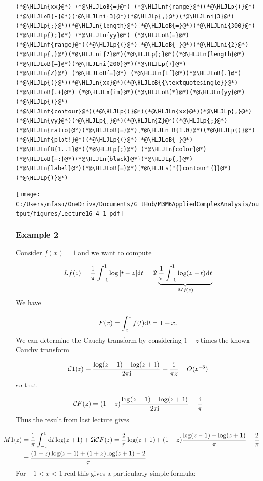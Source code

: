 \documentclass[12pt,landscape]{article}
\newcommand{\HLJLn}[1]{#1}
\newcommand{\HLJLnf}[1]{\textcolor[RGB]{66,102,213}{#1}}
\newcommand{\HLJLs}[1]{\textcolor[RGB]{201,61,57}{#1}}
\newcommand{\HLJLnfB}[1]{\textcolor[RGB]{59,151,46}{#1}}
\newcommand{\HLJLni}[1]{\textcolor[RGB]{59,151,46}{#1}}
\newcommand{\HLJLoB}[1]{\textcolor[RGB]{102,102,102}{\textbf{#1}}}
\newcommand{\HLJLp}[1]{#1}
\def\D{ {\rm d} }
\def\I{ {\rm i} }
\def\CC{ {\cal C} }
\begin{document}
{\begin{lstlisting}
(*@\HLJLn{xx}@*) (*@\HLJLoB{=}@*) (*@\HLJLnf{range}@*)(*@\HLJLp{(}@*)(*@\HLJLoB{-}@*)(*@\HLJLni{3}@*)(*@\HLJLp{,}@*)(*@\HLJLni{3}@*)(*@\HLJLp{;}@*)(*@\HLJLn{length}@*)(*@\HLJLoB{=}@*)(*@\HLJLni{300}@*)(*@\HLJLp{);}@*) (*@\HLJLn{yy}@*) (*@\HLJLoB{=}@*) (*@\HLJLnf{range}@*)(*@\HLJLp{(}@*)(*@\HLJLoB{-}@*)(*@\HLJLni{2}@*)(*@\HLJLp{,}@*)(*@\HLJLni{2}@*)(*@\HLJLp{;}@*)(*@\HLJLn{length}@*)(*@\HLJLoB{=}@*)(*@\HLJLni{200}@*)(*@\HLJLp{)}@*)
(*@\HLJLn{Z}@*) (*@\HLJLoB{=}@*) (*@\HLJLn{Lf}@*)(*@\HLJLoB{.}@*)(*@\HLJLp{(}@*)(*@\HLJLn{xx}@*)(*@\HLJLoB{{\textquotesingle}}@*) (*@\HLJLoB{.+}@*) (*@\HLJLn{im}@*)(*@\HLJLoB{*}@*)(*@\HLJLn{yy}@*)(*@\HLJLp{)}@*)
(*@\HLJLnf{contour}@*)(*@\HLJLp{(}@*)(*@\HLJLn{xx}@*)(*@\HLJLp{,}@*)(*@\HLJLn{yy}@*)(*@\HLJLp{,}@*)(*@\HLJLn{Z}@*)(*@\HLJLp{;}@*)(*@\HLJLn{ratio}@*)(*@\HLJLoB{=}@*)(*@\HLJLnfB{1.0}@*)(*@\HLJLp{)}@*)
(*@\HLJLnf{plot!}@*)(*@\HLJLp{(}@*)(*@\HLJLoB{-}@*)(*@\HLJLnfB{1..1}@*)(*@\HLJLp{;}@*) (*@\HLJLn{color}@*)(*@\HLJLoB{=:}@*)(*@\HLJLn{black}@*)(*@\HLJLp{,}@*) (*@\HLJLn{label}@*)(*@\HLJLoB{=}@*)(*@\HLJLs{"{}contour"{}}@*)(*@\HLJLp{)}@*)
\end{lstlisting}

\texttt{[image: C:/Users/mfaso/OneDrive/Documents/GitHub/M3M6AppliedComplexAnalysis/output/figures/Lecture16\_4\_1.pdf]}

\subsubsection{Example 2}
Consider $f(x) = 1$ and we want to compute

\[
L f(z) = {1 \over \pi} \int_{-1}^1 \log|t-z| \D t = \Re \underbrace{{1 \over \pi} \int_{-1}^1 \log(z-t) \D t }_{M f(z)}
\]
We have

\[
F(x) = \int_x^1 f(t) \D t = 1-x.
\]
We can determine the Cauchy transform by considering $1-z$ times the known Cauchy transform

\[
\CC 1(z) = {\log(z-1) - \log(z+1) \over 2 \pi \I} = {\I  \over  \pi z} + O(z^{-3})
\]
so that

\[
\CC F(z) =  (1-z) {\log(z-1) - \log(z+1) \over 2 \pi \I} + {\I \over \pi}
\]
Thus the result from last lecture gives


\begin{align*}
\hspace*{-0.7cm} M 1(z) &= {1 \over \pi} \int_{-1}^1  \D t \log(z+1)+ 2 \I \CC F(z) = {2 \over \pi} \log(z+1) +
(1-z) {\log(z-1) - \log(z+1) \over \pi} - {2 \over \pi} \\
&= {(1-z) \log(z-1) + (1+z) \log(z+1) -2 \over \pi}
\end{align*}
For $-1 < x < 1$ real this gives a particularly simple formula:

}
\end{document}
